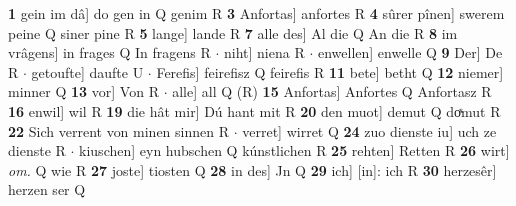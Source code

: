 \documentclass[8pt,a4paper,notitlepage]{article}
\begin{document}
\begin{table}[ht]
\begin{minipage}[t]{0.5\linewidth}
\textbf{1} gein im dâ] do gen in Q genim R \textbf{3} Anfortas] anfortes R \textbf{4} sûrer pînen] swerem peine Q siner pine R \textbf{5} lange] lande R \textbf{7} alle des] Al die Q An die R \textbf{8} im vrâgens] in frages Q In fragens R  $\cdot$ niht] niena R  $\cdot$ enwellen] enwelle Q \textbf{9} Der] De R  $\cdot$ getoufte] daufte U  $\cdot$ Ferefis] feirefisz Q feirefis R \textbf{11} bete] betht Q \textbf{12} niemer] minner Q \textbf{13} vor] Von R  $\cdot$ alle] all Q (R) \textbf{15} Anfortas] Anfortes Q Anfortasz R \textbf{16} enwil] wil R \textbf{19} die hât mir] Dú hant mit R \textbf{20} den muot] demut Q doͯmut R \textbf{22} Sich verrent von minen sinnen R  $\cdot$ verret] wirret Q \textbf{24} zuo dienste iu] uch ze dienste R  $\cdot$ kiuschen] eyn hubschen Q kúnstlichen R \textbf{25} rehten] Retten R \textbf{26} wirt] \textit{om.} Q wie R \textbf{27} joste] tiosten Q \textbf{28} in des] Jn Q \textbf{29} ich] [in]: ich R \textbf{30} herzesêr] herzen ser Q \newline
\end{minipage}
\end{table}
\end{document}
